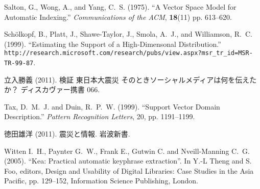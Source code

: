 \documentclass[japanese]{jnlp_1.4}
\begin{document}
\begin{thebibliography}{}
\item
Salton, G., Wong, A., and Yang, C.~S. (1975). ``A Vector Space Model for 
Automatic Indexing.'' \textit{Communications of the ACM}, \textbf{18}(11) pp. 613--620.

\item
Sch\"{o}lkopf, B., Platt, J., Shawe-Taylor, J., Smola, A.~J., and Williamson, R.~C. (1999). 
``Estimating the
Support of a High-Dimensonal Distribution.'' \texttt{http://\linebreak[2]research.\linebreak[2]microsoft.\linebreak[2]com/\linebreak[2]research/\linebreak[2]pubs/\linebreak[2]view.\linebreak[2]aspx?msr\_tr\_id=\linebreak[2]MSR-TR-99-87}.

\item 
立入勝義 (2011). 検証 東日本大震災 
そのときソーシャルメディアは何を伝えたか？ ディスカヴァー携書 066.

\item
Tax, D.~M.~J. and Duin, R.~P.~W. (1999). ``Support Vector Domain Description.'' \textit{Pattern 
Recognition Letters}, 20, pp. 1191--1199.

\item 
徳田雄洋 (2011). 震災と情報. 岩波新書.

\item
Witten I.~H., Paynter G.~W., Frank E., Gutwin C. and Nveill-Manning C.~G. 
(2005). ``Kea: Practical automatic keyphrase extraction''. In Y.-L Theng and 
S. Foo, editors, Design and Usability of Digital Libraries: Case Studies in 
the Asia Pacific, pp. 129--152, Information Science Publishing, London.

\end{thebibliography}




\begin{biography}


\end{biography}


\biodate
\end{document}
